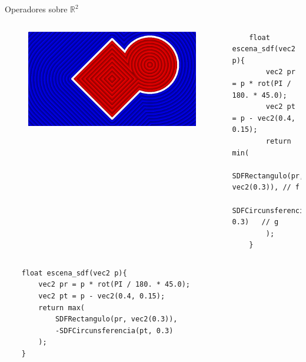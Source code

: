\begin{frame}[fragile]{Operadores sobre \(\mathbb{R}^2\)}

    \begin{columns}[c, onlytextwidth]
        \column{1.5in}
            \begin{figure}[H]
              \centering
              \includegraphics[width=1.0\textwidth]{imagenes/sdf/2d/sdf_add.png}
            \end{figure}
        
        \column{\dimexpr\paperwidth-10pt}
        
            \begin{lstlisting}
    float escena_sdf(vec2 p){
        vec2 pr = p * rot(PI / 180. * 45.0);
        vec2 pt = p - vec2(0.4, 0.15);
        return min(
            SDFRectangulo(pr, vec2(0.3)), // f
            SDFCircunsferencia(pt, 0.3)   // g
        );
    }
            \end{lstlisting}
        
    \end{columns}
    
    \begin{columns}[c, onlytextwidth]
        \column{\dimexpr\paperwidth-140pt}
            \begin{lstlisting}
    float escena_sdf(vec2 p){
        vec2 pr = p * rot(PI / 180. * 45.0);
        vec2 pt = p - vec2(0.4, 0.15);
        return max(
            SDFRectangulo(pr, vec2(0.3)),
            -SDFCircunsferencia(pt, 0.3)
        );
    }
            \end{lstlisting}
    

\end{columns}
\end{frame}
